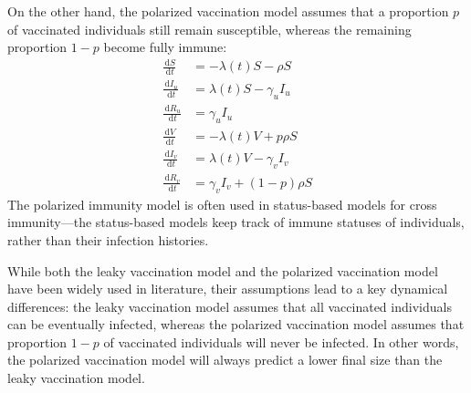 \documentclass[12pt]{article}
\newcommand{\dd}[1]{\ensuremath{\, \mathrm{d}#1}}
\begin{document}
On the other hand, the polarized vaccination model assumes that a proportion $p$ of vaccinated individuals still remain susceptible, whereas the remaining proportion $1-p$ become fully immune: 
\begin{align}
\frac{\dd S}{\dd t} &= - \lambda(t) S - \rho S \\
\frac{\dd I_u}{\dd t} &= \lambda(t) S - \gamma_u I_u \\
\frac{\dd R_u}{\dd t} &= \gamma_u I_u \\
\frac{\dd V}{\dd t} &= - \lambda(t) V + p \rho S \\
\frac{\dd I_v}{\dd t} &= \lambda(t) V - \gamma_v I_v \\
\frac{\dd R_v}{\dd t} &= \gamma_v I_v + (1-p) \rho S
\end{align}
The polarized immunity model is often used in status-based models for cross immunity---the status-based models keep track of immune statuses of individuals, rather than their infection histories.

While both the leaky vaccination model and the polarized vaccination model have been widely used in literature, their assumptions lead to a key dynamical differences: the leaky vaccination model assumes that all vaccinated individuals can be eventually infected, whereas the polarized vaccination model assumes that proportion $1-p$ of vaccinated individuals will never be infected.
In other words, the polarized vaccination model will always predict a lower final size than the leaky vaccination model.
\end{document}

